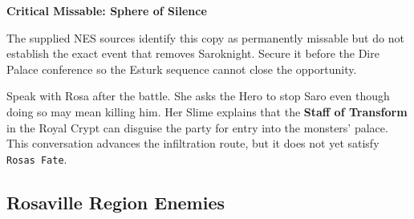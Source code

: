 \documentclass[
  american,
  10pt,
  letterpaper,
  oneside,
  open=any]{scrreprt}
\begin{document}
\begin{guidenote}

\textbf{Critical Missable: Sphere of Silence}

The supplied NES sources identify this copy as permanently missable but
do not establish the exact event that removes Saroknight. Secure it
before the Dire Palace conference so the Esturk sequence cannot close
the opportunity.

\end{guidenote}

Speak with Rosa after the battle. She asks the Hero to stop Saro even
though doing so may mean killing him. Her Slime explains that the
\textbf{Staff of Transform} in the Royal Crypt can disguise the party
for entry into the monsters' palace. This conversation advances the
infiltration route, but it does not yet satisfy
\texttt{Rosa\textquotesingle{}s\ Fate}.

\subsection{Rosaville Region Enemies}\label{rosaville-region-enemies}
\end{document}
